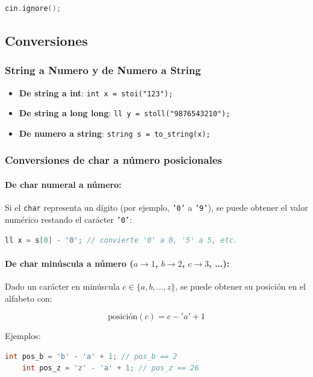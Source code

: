 \begin{lstlisting}[language=C++]
	cin.ignore();
\end{lstlisting}



\subsection{Conversiones }

\subsubsection{String a Numero y de Numero a String }
\begin{itemize}
	\item \textbf{De string a int}: \texttt{int x = stoi("123");}
	\item \textbf{De string a long long}: \texttt{ll y = stoll("9876543210");} 
	\item \textbf{De numero a string}: \texttt{string s = to\_string(x);}
\end{itemize}

\subsubsection{Conversiones de char a número posicionales }

\paragraph{De char numeral a número:}
Si el \texttt{char} representa un dígito (por ejemplo, \texttt{'0'} a \texttt{'9'}), se puede obtener el valor numérico restando el carácter \texttt{'0'}:

\begin{lstlisting}[language=C++]
	ll x = s[0] - '0'; // convierte '0' a 0, '5' a 5, etc.
\end{lstlisting}

\paragraph{De char minúscula a número ($a \to 1$, $b \to 2$, $c \to 3$, ...):}
Dado un carácter en minúscula \( c \in \{a, b, \dots, z\} \), se puede obtener su posición en el alfabeto con:

\[
\text{posición}(c) = c - 'a' + 1
\]

Ejemplos:
\begin{lstlisting}[language=C++]
	int pos_b = 'b' - 'a' + 1; // pos_b == 2
	int pos_z = 'z' - 'a' + 1; // pos_z == 26
\end{lstlisting}

